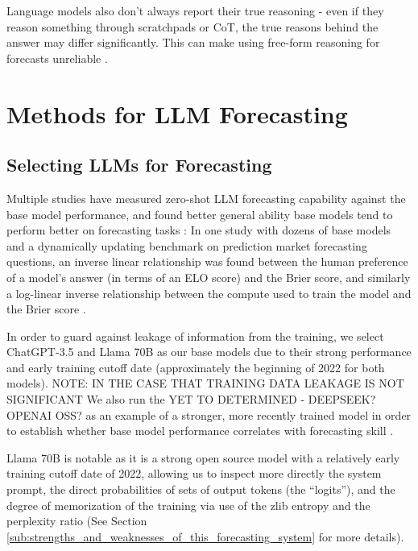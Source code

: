 \documentclass[12pt,a4paper]{article}
\begin{document}
Language models also don't always report their true reasoning  - even if they reason something through scratchpads or CoT, the true reasons behind the answer may differ significantly. This can make using free-form reasoning for forecasts unreliable . 


\clearpage
 \section{Methods for LLM Forecasting}
\subsection{Selecting LLMs for Forecasting \DOMAINCAPITALIZEDINTERVENTIONTWO}
Multiple studies have measured zero-shot LLM forecasting capability against the base model performance, and found better general ability base models tend to perform better on forecasting tasks  : In one study with dozens of base models and a dynamically updating benchmark on prediction market forecasting questions, an inverse linear relationship was found between the human preference of a model's answer (in terms of an ELO score) and the Brier score, and similarly a log-linear inverse relationship between the compute used to train the model and the Brier score .

In order to guard against leakage of information from the training, we select ChatGPT-3.5 and Llama 70B  as our base models due to their strong performance and early training cutoff date (approximately the beginning of 2022 for both models). NOTE: IN THE CASE THAT TRAINING DATA LEAKAGE IS NOT SIGNIFICANT We also run the YET TO DETERMINED - DEEPSEEK? OPENAI OSS? as an example of a stronger, more recently trained model in order to establish whether base model performance correlates with forecasting skill \ABSTRACT. 

Llama 70B is notable as it is a strong open source model with a relatively early training cutoff date of 2022, allowing us to inspect more directly the system prompt, the direct probabilities of sets of output tokens (the ``logits''), and the degree of memorization of the training via use of the zlib entropy and the perplexity ratio (See Section \ref{sub:strengths_and_weaknesses_of_this_forecasting_system} for more details).
\end{document}

